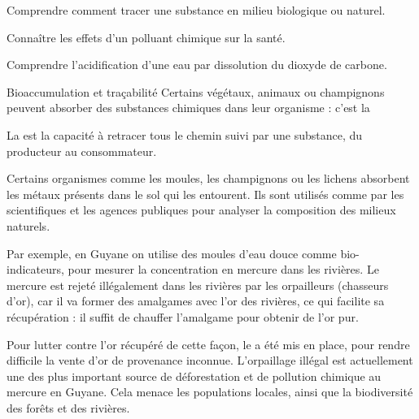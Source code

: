 \teteTermStssDosa
\vspace*{-30pt}

\begin{objectifs}
  \item Comprendre comment tracer une substance en milieu biologique ou naturel.
  \item Connaître les effets d’un polluant chimique sur la santé.
  \item Comprendre l'acidification d’une eau par dissolution du dioxyde de carbone.
\end{objectifs}


\begin{doc}{Bioaccumulation et traçabilité}
  Certains végétaux, animaux ou champignons peuvent absorber des substances chimiques dans leur organisme : c'est la 

  \begin{importants}
    La  est la capacité à retracer tous le chemin suivi par une substance, du producteur au consommateur.
  \end{importants}

  Certains organismes comme les moules, les champignons ou les lichens absorbent les métaux présents dans le sol qui les entourent. 
  Ils sont utilisés comme  par les scientifiques et les agences publiques pour analyser la composition des milieux naturels.
  \medskip

  Par exemple, en Guyane on utilise des moules d'eau douce comme bio-indicateurs, pour mesurer la concentration en mercure dans les rivières. 
  Le mercure est rejeté illégalement dans les rivières par les orpailleurs (chasseurs d'or), car il va former des amalgames avec l'or des rivières, ce qui facilite sa récupération : il suffit de chauffer l'amalgame pour obtenir de l'or pur.

  Pour lutter contre l'or récupéré de cette façon, le  a été mis en place, pour rendre difficile la vente d'or de provenance inconnue.
  L'orpaillage illégal est actuellement une des plus important source de déforestation et de pollution chimique au mercure en Guyane.
  Cela menace les populations locales, ainsi que la biodiversité des forêts et des rivières.
\end{doc}

